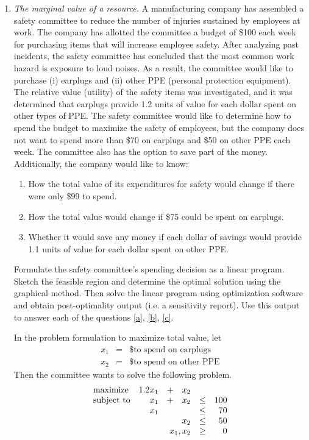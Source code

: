 \begin{enumerate}
\item \emph{The marginal value of a resource.}
A manufacturing company has assembled a safety committee to reduce the number of injuries sustained by employees at work. The company has allotted the committee a budget of \$100 each week for purchasing items that will increase employee safety. After analyzing past incidents, the safety committee has concluded that the most common work hazard is exposure to loud noises. As a result, the committee would like to purchase (i) earplugs and (ii) other PPE (personal protection equipment). The relative value (utility) of the safety items was investigated, and it was determined that earplugs provide 1.2 units of value for each dollar spent on other types of PPE. The safety committee would like to determine how to spend the budget to maximize the safety of employees, but the company does not want to spend more than \$70 on earplugs and \$50 on other PPE each week. The committee also has the option to save part of the money.
Additionally, the company would like to know:
\begin{enumerate}
\item How the total value of its expenditures for safety would change
  if there were only \$99 to spend. \label{a}
\item How the total value would change if \$75 could be spent on
  earplugs.\label{b}
\item Whether it would save any money if each dollar of savings would
  provide 1.1 units of value for each dollar spent on other
  PPE.\label{c}
\end{enumerate}
Formulate the safety committee's spending decision as a linear program. Sketch
the feasible region and determine the optimal solution using the
graphical method.  Then solve the linear program using optimization
software and obtain post-optimality output (i.e. a sensitivity
report).  Use this output to answer each of the questions \ref{a},
\ref{b}, \ref{c}.

\begin{solution}
\bs
In the problem formulation to maximize total value, let
\[
  \begin{array}{lcl}
    x_1 &=& \textrm{\$ to spend on earplugs} \\
    x_2 &=& \textrm{\$ to spend on other PPE}
  \end{array}
\]
Then the committee wants to solve the following problem.
\[
\begin{array}{lrrrrr}
\textrm{maximize}   & 1.2x_1& +& x_2&      &   \\
\textrm{subject to} & x_1& +&x_2& \leq & 100 \\
                    & x_1& & & \leq & 70 \\
                    & & & x_2& \leq & 50 \\
\multicolumn{4}{r}{x_1,x_2}&       \geq & 0
\end{array}
\]


\end{solution}
\end{enumerate}
